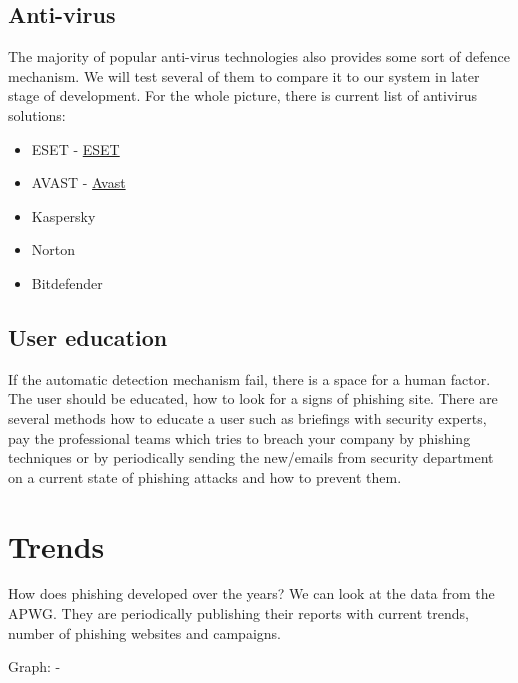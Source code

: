 \documentclass[
  digital, %
  oneside, %
  table,   %
  nolof,     %
  nolot,     %
]{fithesis3}
\begin{document}
\subsection{Anti-virus}



The majority of popular anti-virus technologies also provides some sort of defence mechanism. We will test several of them to compare it to our system in later stage of development. For the whole picture, there is current list of antivirus solutions:
\begin{itemize}
    \item ESET - \href{https://www.eset.com/us/anti-phishing/}{ESET}
    \item AVAST - \href{https://blog.avast.com/avast-improves-phishing-detection-avast}{Avast}
    \item Kaspersky
    \item Norton
    \item Bitdefender
\end{itemize}


\subsection{User education}

If the automatic detection mechanism fail, there is a space for a human factor. The user should be educated, how to look for a signs of phishing site. There are several methods how to educate a user such as briefings with security experts, \cite{citacia na edukaciu} pay the professional teams which tries to breach your company by phishing techniques \cite{citacia na edukaciu} \cite{citacia na edukaciu} or by periodically sending the new/emails from security department on a current state of phishing attacks and how to prevent them.

\section{Trends}

How does phishing developed over the years? We can look at the data from the APWG. They are periodically publishing their reports with current trends, number of phishing websites and campaigns.



Graph: \cite{apwg-2012-4} - \cite{apwg-2019-2}
\end{document}
